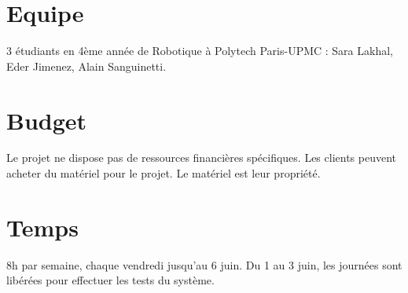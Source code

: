 \documentclass[oneside, DIV=11]{scrreprt}
\begin{document}
\section{Equipe}
3 étudiants en 4ème année de Robotique à Polytech Paris-UPMC :
Sara Lakhal, Eder Jimenez, Alain Sanguinetti.

\section{Budget}
Le projet ne dispose pas de ressources financières spécifiques. Les clients peuvent acheter du matériel pour le projet. Le matériel est leur propriété.

\section{Temps}
8h par semaine, chaque vendredi jusqu’au 6 juin.
Du 1 au 3 juin, les journées sont libérées pour effectuer les tests du système.





\label{LastPage}
\end{document}
